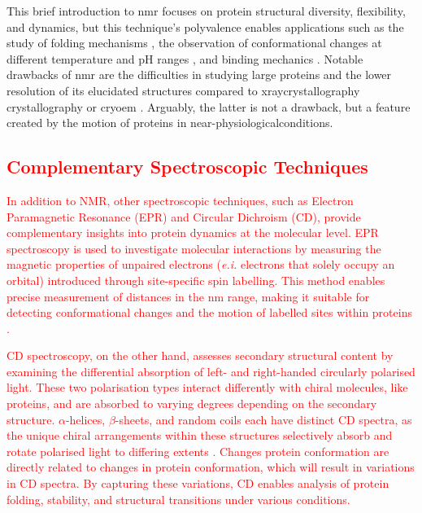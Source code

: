 This brief introduction to \gls{nmr} focuses on protein structural diversity, \gls{flexibility}, and \gls{dynamics}, but this technique's polyvalence enables applications such as the study of folding mechanisms \cite{peacock_hydrogendeuterium_2021}, the observation of conformational changes at different temperature and pH ranges \cite{gerken_measurement_2011}, and binding mechanics \cite{dubey_role_2020}. Notable drawbacks of \gls{nmr} are the difficulties in studying large proteins \cite{frueh_nmr_2013} and the lower resolution of its elucidated structures compared to \gls{xraycrystallography} crystallography or \gls{cryoem} \cite{kwan_macromolecular_2011}. Arguably, the latter is not a drawback, but a feature created by the motion of proteins in near-\gls{physiologicalconditions}.

\subsection{\textcolor{red}{Complementary Spectroscopic Techniques}}

\textcolor{red}{In addition to NMR, other spectroscopic techniques, such as Electron Paramagnetic Resonance (EPR) and Circular Dichroism (CD), provide complementary insights into protein dynamics at the molecular level. EPR spectroscopy is used to investigate molecular interactions by measuring the magnetic properties of unpaired electrons (\textit{e.i.} electrons that solely occupy an orbital) introduced through site-specific spin labelling. This method enables precise measurement of distances in the nm range, making it suitable for detecting conformational changes and the motion of labelled sites within proteins \cite{sahu_electron_2020}.}

\textcolor{red}{CD spectroscopy, on the other hand, assesses secondary structural content by examining the differential absorption of left- and right-handed circularly polarised light. These two polarisation types interact differently with chiral molecules, like proteins, and are absorbed to varying degrees depending on the secondary structure. $\alpha$-helices, $\beta$-sheets, and random coils each have distinct CD spectra, as the unique chiral arrangements within these structures selectively absorb and rotate polarised light to differing extents \cite{greenfield_using_2006}. Changes protein conformation are directly related to changes in protein conformation, which will result in variations in CD spectra. By capturing these variations, CD enables analysis of protein folding, stability, and structural transitions under various conditions.}

